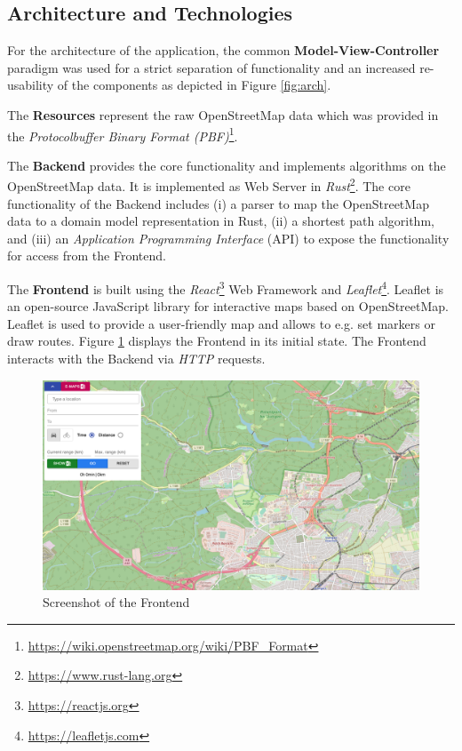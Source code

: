 \documentclass[a4paper]{article}
\begin{document}
\subsection{Architecture and Technologies}
For the architecture of the application, the common \textbf{Model-View-Controller} paradigm was used for a strict separation of functionality and an increased re-usability of the components as depicted in Figure \ref{fig:arch}.\par\medskip
The \textbf{Resources} represent the raw OpenStreetMap data which was provided in the \textit{Protocolbuffer Binary Format (PBF)}\footnote{\url{https://wiki.openstreetmap.org/wiki/PBF_Format}}.\par\medskip
The \textbf{Backend} provides the core functionality and implements algorithms on the OpenStreetMap data.
It is implemented as Web Server in \textit{Rust}\footnote{\url{https://www.rust-lang.org}}.
The core functionality of the Backend includes (i) a parser to map the OpenStreetMap data to a domain model representation in Rust,
(ii) a shortest path algorithm, and (iii) an \textit{Application Programming Interface} (API) to expose the functionality for access from the Frontend.\par\medskip
The \textbf{Frontend} is built using the \textit{React}\footnote{\url{https://reactjs.org}} Web Framework and \textit{Leaflet}\footnote{\url{https://leafletjs.com}}. Leaflet is an open-source JavaScript library for interactive maps based on OpenStreetMap.
Leaflet is used to provide a user-friendly map and allows to e.g. set markers or draw routes.
Figure \ref{fig:base_ui} displays the Frontend in its initial state.
The Frontend interacts with the Backend via \textit{HTTP} requests.
\begin{figure}[h]
    \centering
    \includegraphics[scale=0.27]{figures/base_ui}
    \caption{Screenshot of the Frontend}
    \label{fig:base_ui}
\end{figure}
\end{document}
